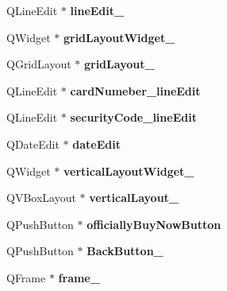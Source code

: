 \begin{DoxyCompactItemize}
Q\+Line\+Edit $\ast$ {\bfseries line\+Edit\+\_}
\item 
\mbox{\label{class_ui___main_interface_a2921c450a0c6cd0e02733ee774b67629}} 
Q\+Widget $\ast$ {\bfseries grid\+Layout\+Widget\+\_}
\item 
\mbox{\label{class_ui___main_interface_a4807812f6e0a5b7b3bdda1e57c5fe1ff}} 
Q\+Grid\+Layout $\ast$ {\bfseries grid\+Layout\+\_}
\item 
\mbox{\label{class_ui___main_interface_a09b22a2cb356c22e57411a76cb3e88e1}} 
Q\+Line\+Edit $\ast$ {\bfseries card\+Numeber\+\_\+line\+Edit}
\item 
\mbox{\label{class_ui___main_interface_ae2616aa8332ddfbd7a050ee5792aa7f4}} 
Q\+Line\+Edit $\ast$ {\bfseries security\+Code\+\_\+line\+Edit}
\item 
\mbox{\label{class_ui___main_interface_a1776de66a46239cc751d2112cad75134}} 
Q\+Date\+Edit $\ast$ {\bfseries date\+Edit}
\item 
\mbox{\label{class_ui___main_interface_a9ff8c7c9c3c087dd992e4efbb2bd24f2}} 
Q\+Widget $\ast$ {\bfseries vertical\+Layout\+Widget\+\_}
\item 
\mbox{\label{class_ui___main_interface_a00950cc1e388e3428f87e784441074e8}} 
Q\+V\+Box\+Layout $\ast$ {\bfseries vertical\+Layout\+\_}
\item 
\mbox{\label{class_ui___main_interface_a59713f7109c34983f6b728a5ffb7fc6b}} 
Q\+Push\+Button $\ast$ {\bfseries officially\+Buy\+Now\+Button}
\item 
\mbox{\label{class_ui___main_interface_ac6f3a5379e412c471b7a18f1d0395ba5}} 
Q\+Push\+Button $\ast$ {\bfseries Back\+Button\+\_}
\item 
\mbox{\label{class_ui___main_interface_a2aa67bae2e7dc9098eb652994908daa0}} 
Q\+Frame $\ast$ {\bfseries frame\+\_}
\item 

\end{DoxyCompactItemize}
